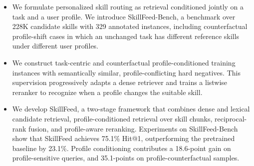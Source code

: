 \documentclass[letterpaper]{article} %
\begin{document}
\begin{itemize}
  \item We formulate personalized skill routing as retrieval conditioned jointly on a task and a user profile. We introduce SkillFeed-Bench, a benchmark over 228K candidate skills with 329 annotated instances, including counterfactual profile-shift cases in which an unchanged task has different reference skills under different user profiles.
  
  \item We construct task-centric and counterfactual profile-conditioned training instances with semantically similar, profile-conflicting hard negatives. This supervision progressively adapts a dense retriever and trains a listwise reranker to recognize when a profile changes the suitable skill.

  \item We develop SkillFeed, a two-stage framework that combines dense and lexical candidate retrieval, profile-conditioned retrieval over skill chunks, reciprocal-rank fusion, and profile-aware reranking. 
  Experiments on SkillFeed-Bench show that SkillFeed achieves 75.1\% Hit@1,
    outperforming the pretrained baseline by 23.1\%. Profile conditioning contributes a 18.6-point gain on profile-sensitive queries, and 35.1-points on profile-counterfactual samples.
  
\end{itemize}

  
\end{document}
